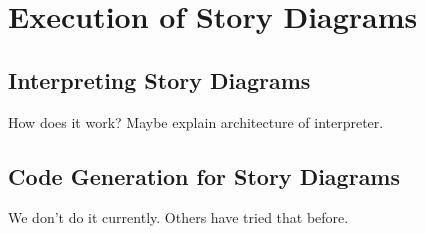 \chapter{Execution of Story Diagrams}

\section{Interpreting Story Diagrams}
How does it work? Maybe explain architecture of interpreter.
\cite{GHS09}

\section{Code Generation for Story Diagrams}
 We don't do it currently. Others have tried that before.\cite{GBD07}
